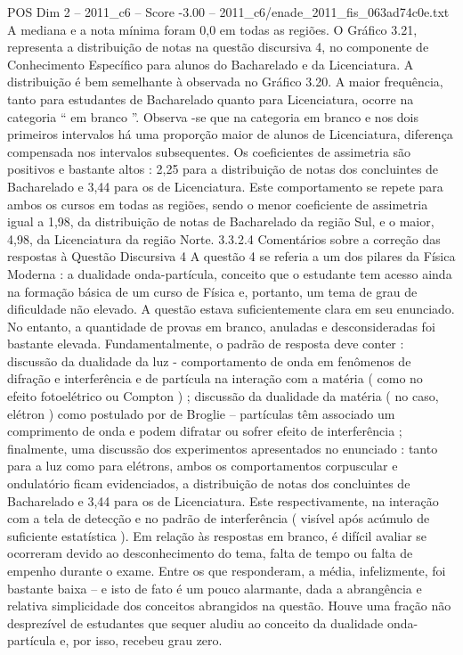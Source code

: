 \begin{textsample}{POS Dim 2 – 2011\_c6 – Score -3.00 – 2011\_c6/enade\_2011\_fis\_063ad74c0e.txt}
A mediana e a nota mínima foram 0,0 em todas as regiões.
O Gráfico 3.21, representa a distribuição de notas na questão discursiva 4, no componente de Conhecimento Específico para alunos do Bacharelado e da Licenciatura.
A distribuição é bem semelhante à observada no Gráfico 3.20.
A maior frequência, tanto para estudantes de Bacharelado quanto para Licenciatura, ocorre na categoria “ em branco ”.
Observa -se que na categoria em branco e nos dois primeiros intervalos há uma proporção maior de alunos de Licenciatura, diferença compensada nos intervalos subsequentes.
Os coeficientes de assimetria são positivos e bastante altos : 2,25 para a distribuição de notas dos concluintes de Bacharelado e 3,44 para os de Licenciatura.
Este comportamento se repete para ambos os cursos em todas as regiões, sendo o menor coeficiente de assimetria igual a 1,98, da distribuição de notas de Bacharelado da região Sul, e o maior, 4,98, da Licenciatura da região Norte. 3.3.2.4 Comentários sobre a correção das respostas à Questão Discursiva 4 A questão 4 se referia a um dos pilares da Física Moderna : a dualidade onda-partícula, conceito que o estudante tem acesso ainda na formação básica de um curso de Física e, portanto, um tema de grau de dificuldade não elevado.
A questão estava suficientemente clara em seu enunciado.
No entanto, a quantidade de provas em branco, anuladas e desconsideradas foi bastante elevada.
Fundamentalmente, o padrão de resposta deve conter : discussão da dualidade da luz - comportamento de onda em fenômenos de difração e interferência e de partícula na interação com a matéria ( como no efeito fotoelétrico ou Compton ) ; discussão da dualidade da matéria ( no caso, elétron ) como postulado por de Broglie – partículas têm associado um comprimento de onda e podem difratar ou sofrer efeito de interferência ; finalmente, uma discussão dos experimentos apresentados no enunciado : tanto para a luz como para elétrons, ambos os comportamentos corpuscular e ondulatório ficam evidenciados, a distribuição de notas dos concluintes de Bacharelado e 3,44 para os de Licenciatura.
Este respectivamente, na interação com a tela de detecção e no padrão de interferência ( visível após acúmulo de suficiente estatística ).
Em relação às respostas em branco, é difícil avaliar se ocorreram devido ao desconhecimento do tema, falta de tempo ou falta de empenho durante o exame.
Entre os que responderam, a média, infelizmente, foi bastante baixa – e isto de fato é um pouco alarmante, dada a abrangência e relativa simplicidade dos conceitos abrangidos na questão.
Houve uma fração não desprezível de estudantes que sequer aludiu ao conceito da dualidade onda-partícula e, por isso, recebeu grau zero.

\end{textsample}
